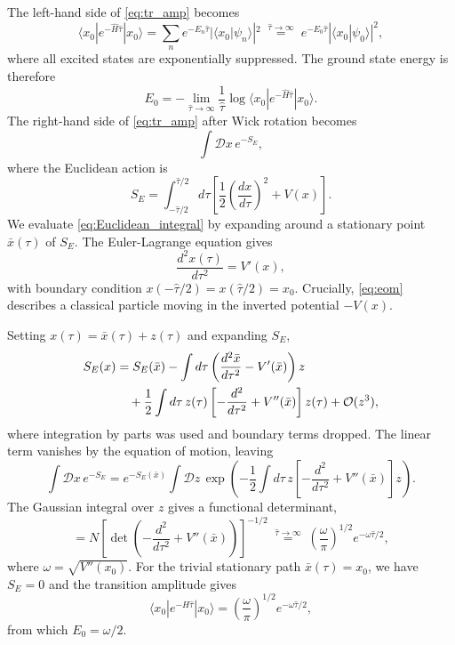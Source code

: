 The left-hand side of \eqref{eq:tr_amp} becomes
\begin{equation}
	\langle x_0|e^{-\hat H\hat\tau}|x_0\rangle
	= \sum_n e^{-E_n\hat\tau}|\langle x_0|\psi_n\rangle|^2
	\;\overset{\hat\tau\to\infty}{=}\;
	e^{-E_0\hat\tau}|\langle x_0|\psi_0\rangle|^2,
\end{equation}
where all excited states are exponentially suppressed. The ground state
energy is therefore
\begin{equation}
	E_0 = -\lim_{\hat\tau\to\infty}\frac{1}{\hat\tau}
	\log\langle x_0|e^{-\hat H\hat\tau}|x_0\rangle.
\end{equation}
The right-hand side of \eqref{eq:tr_amp} after Wick rotation becomes
\begin{equation}
	\int\mathcal{D}x\,e^{-S_E},
	\label{eq:Euclidean_integral}
\end{equation}
where the Euclidean action is
\begin{equation}
	S_E = \int_{-\hat\tau/2}^{\hat\tau/2}d\tau\left[
		\frac{1}{2}\left(\frac{dx}{d\tau}\right)^2 + V(x)\right].
	\label{eq:Euclidean_action}
\end{equation}
We evaluate \eqref{eq:Euclidean_integral} by expanding around a
stationary point $\bar x(\tau)$ of $S_E$. The Euler-Lagrange equation
gives
\begin{equation}
	\frac{d^2 x(\tau)}{d\tau^2} = V'(x),
	\label{eq:eom}
\end{equation}
with boundary condition $x(-\hat\tau/2) = x(\hat\tau/2) = x_0$.
Crucially, \eqref{eq:eom} describes a classical particle moving in the
inverted potential $-V(x)$.

Setting $x(\tau) = \bar x(\tau) + z(\tau)$ and expanding $S_E$,
\begin{align}
	S_E(x) & = S_E(\bar x)
	- \int d\tau\left(\frac{d^2\bar x}{d\tau^2}
	- V'(\bar x)\right)z \notag                    \\
	       & \quad+ \frac{1}{2}\int d\tau\,z(\tau)
	\left[-\frac{d^2}{d\tau^2} + V''(\bar x)\right]z(\tau)
	+ \mathcal{O}(z^3),
\end{align}
where integration by parts was used and boundary terms dropped. The
linear term vanishes by the equation of motion, leaving
\begin{equation}
	\int\mathcal{D}x\,e^{-S_E}
	= e^{-S_E(\bar x)}\int\mathcal{D}z\,
	\exp\left(-\frac{1}{2}\int d\tau\,z
	\left[-\frac{d^2}{d\tau^2}+V''(\bar x)\right]z\right).
\end{equation}
The Gaussian integral over $z$ gives a functional determinant,
\begin{equation}
	= N\left[\det\left(-\frac{d^2}{d\tau^2}
		+ V''(\bar x)\right)\right]^{-1/2}
	\;\overset{\hat\tau\to\infty}{=}\;
	\left(\frac{\omega}{\pi}\right)^{1/2}e^{-\omega\hat\tau/2},
\end{equation}
where $\omega = \sqrt{V''(x_0)}$. For the trivial stationary path
$\bar x(\tau) = x_0$, we have $S_E = 0$ and the transition amplitude
gives
\begin{equation}
	\langle x_0|e^{-H\hat\tau}|x_0\rangle
	= \left(\frac{\omega}{\pi}\right)^{1/2}e^{-\omega\hat\tau/2},
\end{equation}
from which $E_0 = \omega/2$.

